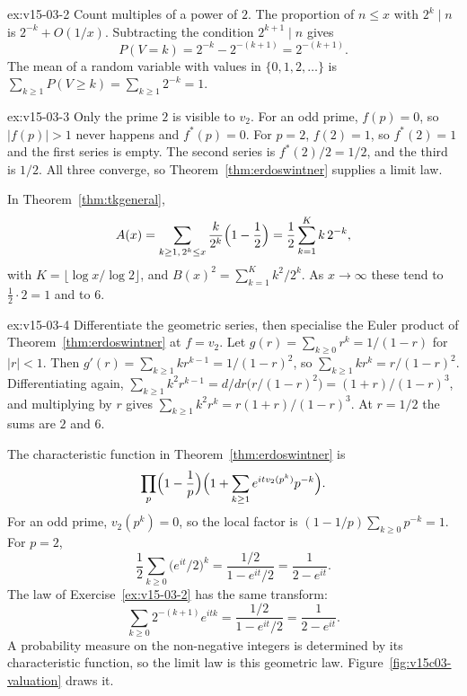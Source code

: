\begin{solution}{ex:v15-03-2}
\idea Count multiples of a power of \(2\).
\writeup The proportion of \(n\le x\) with \(2^k\mid n\) is \(2^{-k}+O(1/x)\). Subtracting the condition \(2^{k+1}\mid n\) gives
\[
P(V=k)=2^{-k}-2^{-(k+1)}=2^{-(k+1)}.
\]
The mean of a random variable with values in \(\{0,1,2,\dots\}\) is \(\sum_{k\ge1}P(V\ge k)=\sum_{k\ge1}2^{-k}=1\).
\end{solution}

\begin{solution}{ex:v15-03-3}
\idea Only the prime \(2\) is visible to \(v_2\).
\writeup For an odd prime, \(f(p)=0\), so \(|f(p)|>1\) never happens and \(f^*(p)=0\). For \(p=2\), \(f(2)=1\), so \(f^*(2)=1\) and the first series is empty. The second series is \(f^*(2)/2=1/2\), and the third is \(1/2\). All three converge, so Theorem~\ref{thm:erdoswintner} supplies a limit law.

In Theorem~\ref{thm:tkgeneral},
\[
A(x)=\sum_{k\ge1,\,2^k\le x}\frac{k}{2^k}\Bigl(1-\frac12\Bigr)=\frac12\sum_{k=1}^{K}k\,2^{-k},
\]
with \(K=\lfloor\log x/\log2\rfloor\), and \(B(x)^2=\sum_{k=1}^{K}k^2/2^k\). As \(x\to\infty\) these tend to \(\tfrac12\cdot2=1\) and to \(6\).
\end{solution}

\begin{solution}{ex:v15-03-4}
\idea Differentiate the geometric series, then specialise the Euler product of Theorem~\ref{thm:erdoswintner} at \(f=v_2\).
\writeup Let \(g(r)=\sum_{k\ge0}r^k=1/(1-r)\) for \(|r|<1\). Then \(g'(r)=\sum_{k\ge1}kr^{k-1}=1/(1-r)^2\), so \(\sum_{k\ge1}kr^k=r/(1-r)^2\). Differentiating again, \(\sum_{k\ge1}k^2r^{k-1}=d/dr\bigl(r/(1-r)^2\bigr)=(1+r)/(1-r)^3\), and multiplying by \(r\) gives \(\sum_{k\ge1}k^2r^k=r(1+r)/(1-r)^3\). At \(r=1/2\) the sums are \(2\) and \(6\).

The characteristic function in Theorem~\ref{thm:erdoswintner} is
\[
\prod_p\Bigl(1-\frac1p\Bigr)\Bigl(1+\sum_{k\ge1}e^{itv_2(p^k)}p^{-k}\Bigr).
\]
For an odd prime, \(v_2(p^k)=0\), so the local factor is \((1-1/p)\sum_{k\ge0}p^{-k}=1\). For \(p=2\),
\[
\frac12\sum_{k\ge0}\bigl(e^{it}/2\bigr)^k=\frac{1/2}{1-e^{it}/2}=\frac1{2-e^{it}}.
\]
The law of Exercise~\ref{ex:v15-03-2} has the same transform:
\[
\sum_{k\ge0}2^{-(k+1)}e^{itk}=\frac{1/2}{1-e^{it}/2}=\frac1{2-e^{it}}.
\]
A probability measure on the non-negative integers is determined by its characteristic function, so the limit law is this geometric law. Figure~\ref{fig:v15c03-valuation} draws it.
\end{solution}

